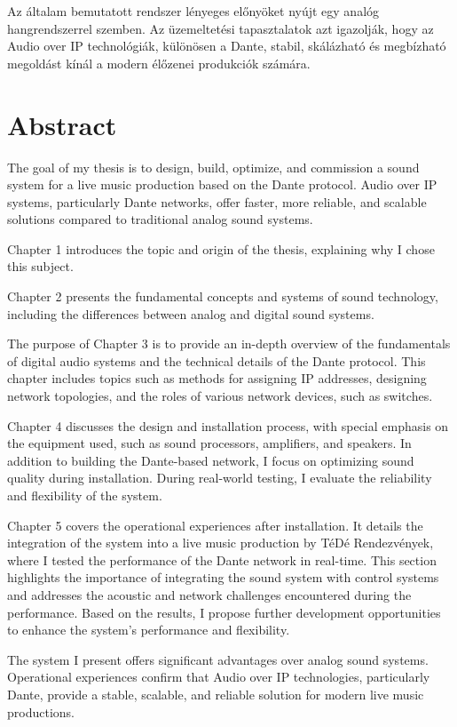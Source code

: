 Az általam bemutatott rendszer lényeges előnyöket nyújt egy analóg 
hangrendszerrel szemben.
Az üzemeltetési tapasztalatok azt igazolják, hogy 
az Audio over IP technológiák, különösen a Dante, 
stabil, skálázható és megbízható megoldást 
kínál a modern élőzenei produkciók számára.


\vfill
\selectenglish


\chapter*{Abstract}

The goal of my thesis is to design, build, optimize, and commission a sound system for 
a live music production based on the Dante protocol. Audio over IP systems, particularly 
Dante networks, offer faster, more reliable, and scalable solutions compared to traditional analog sound systems.

Chapter 1 introduces the topic and origin of the thesis, explaining why I chose this subject.

Chapter 2 presents the fundamental concepts and systems of sound technology, including 
the differences between analog and digital sound systems.

The purpose of Chapter 3 is to provide an in-depth overview of the fundamentals of 
digital audio systems and the technical details of the Dante protocol. This chapter 
includes topics such as methods for assigning IP addresses, designing network 
topologies, and the roles of various network devices, such as switches.

Chapter 4 discusses the design and installation process, with special emphasis on 
the equipment used, such as sound processors, amplifiers, and speakers. 
In addition to building the Dante-based network, I focus on optimizing sound quality 
during installation. During real-world testing, I evaluate the reliability and flexibility of the system.

Chapter 5 covers the operational experiences after installation. It details the 
integration of the system into a live music production by TéDé Rendezvények, where 
I tested the performance of the Dante network in real-time. 
This section highlights the importance of integrating the sound system with 
control systems and addresses the acoustic and network challenges encountered 
during the performance. Based on the results, I propose further development 
opportunities to enhance the system's performance and flexibility.

The system I present offers significant advantages over analog sound systems. 
Operational experiences confirm that Audio over IP technologies, particularly 
Dante, provide a stable, scalable, and reliable solution for modern live music productions.

\vfill
\selectthesislanguage

\setcounter{romanPage}{\value{page}}
